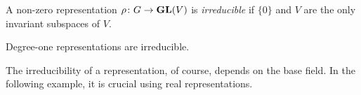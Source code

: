 
\begin{definition}
    A non-zero representation $\rho\colon G\to\mathbf{GL}(V)$ is \emph{irreducible} if
    $\{0\}$ and $V$ are the only invariant subspaces of $V$.
\end{definition}

Degree-one representations are irreducible. 

The irreducibility 
of a representation, of course, depends on the base field. 
In the following example, it is crucial using real representations.

